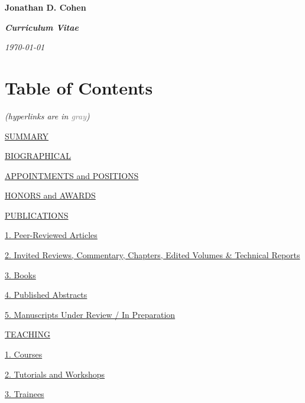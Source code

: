 \documentclass[10 pt]{article}
\begin{document}
\thispagestyle{empty} %

    \begin{center}
{\fontsize{15pt}{16 pt}\selectfont \textbf{Jonathan D. Cohen}}

{\fontsize{14pt}{16 pt}\selectfont \textit{\textbf{Curriculum Vitae}}}

    \medskip
    \textit{\today}
    \bigskip

\section*{Table of Contents} \label{secTOC}
    \vspace{-8pt}
    \emph{(hyperlinks are in \textcolor{gray}{gray})}
    \end{center}
    \medskip

\hyperref[secSUMMARY]{SUMMARY}
    \medskip

\hyperref[secBIOGRAPHICAL]{BIOGRAPHICAL}
    \medskip

\hyperref[secAaP]{APPOINTMENTS and POSITIONS}
    \medskip

\hyperref[secHaA]{HONORS and AWARDS}
    \medskip

\hyperref[secPUBLICATIONS]{PUBLICATIONS}

\hyperref[secPUBLICATIONS1]{\hspace{0.4in} 1. Peer-Reviewed Articles }

\hyperref[secPUBLICATIONS2]{\hspace{0.4in} 2. Invited Reviews, Commentary, Chapters, Edited Volumes \& Technical
Reports}

\hyperref[secPUBLICATIONS3]{\hspace{0.4in} 3. Books}

\hyperref[secPUBLICATIONS4]{\hspace{0.4in} 4. Published Abstracts}

\hyperref[secPUBLICATIONS5]{\hspace{0.4in} 5. Manuscripts Under Review / In Preparation}
    \medskip


\hyperref[secTEACHING]{TEACHING}

\hyperref[secTEACHING1]{\hspace{0.4in} 1. Courses}

\hyperref[secTEACHING2]{\hspace{0.4in} 2. Tutorials and Workshops}

\hyperref[secTEACHING3]{\hspace{0.4in} 3. Trainees}
    \medskip
\end{document}
